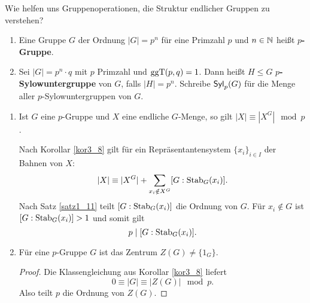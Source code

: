 \begin{leftbar}
	{Wie helfen uns Gruppenoperationen, die Struktur endlicher Gruppen zu verstehen?}
\end{leftbar}
\begin{definition}\label{definiton3_10}
	\begin{enumerate}[label=(\alph*)]
		\item Eine Gruppe $G$ der Ordnung $|G| = p^n$ für eine Primzahl $p$ und $n \in \mathbb{N}$ heißt \textbf{$p$-Gruppe}.
		\item Sei $|G| = p^n \cdot q$ mit $p$ Primzahl und $\mathrm{ggT}(p,q) = 1$. Dann heißt $H \leq G$ \textbf{$p$-Sylowuntergruppe} von $G$, falls $|H| = p^n$. Schreibe $\mathsf{Syl}_p(G)$ für die Menge aller $p$-Sylowuntergruppen von $G$.
	\end{enumerate}
\end{definition}
\begin{rem}\label{rem3_11}
\begin{enumerate}[label=(\roman*)]
	\item 	Ist $G$ eine $p$-Gruppe und $X$ eine endliche $G$-Menge, so gilt $|X| \equiv |X^G| \mod p$.
	\begin{inlproof}
		Nach Korollar \ref{kor3_8} gilt für ein Repräsentantensystem $\{x_i\}_{i \in I}$ der Bahnen von $X$:
		\[|X| \equiv |X^G| + \sum_{x_i \notin X^G} [G : \mathrm{Stab}_G(x_i)].\]
			Nach Satz \ref{satz1_11} teilt $[G: \mathrm{Stab}_G(x_i) ]$ die Ordnung von $G$. Für $x_i \notin G$ ist $[G : \mathrm{Stab}_G(x_i)] > 1$ und somit gilt
			\[p \mid [G : \mathrm{Stab}_G(x_i)].\]
	\end{inlproof}
	\item Für eine $p$-Gruppe $G$ ist das Zentrum $Z(G) \neq \{1_G\}$.
	\begin{proof}
		Die Klassengleichung aus Korollar \ref{kor3_8} liefert 
		\[0 \equiv |G| \equiv |Z(G)| \mod p.\]
		Also teilt $p$ die Ordnung von $Z(G)$.
	\end{proof}	
\end{enumerate}
\end{rem}
